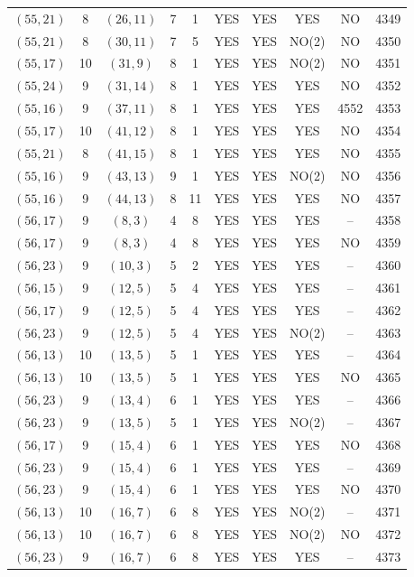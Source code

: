 \begin{longtable}{|c|c|c|c|c|c|c|c|c|c|}
$(55, 21)$ & 8 & $(26, 11)$ & 7 & 1 & YES & YES & YES & NO & 4349\\
$(55, 21)$ & 8 & $(30, 11)$ & 7 & 5 & YES & YES & NO(2) & NO & 4350\\
$(55, 17)$ & 10 & $(31, 9)$ & 8 & 1 & YES & YES & NO(2) & NO & 4351\\
$(55, 24)$ & 9 & $(31, 14)$ & 8 & 1 & YES & YES & YES & NO & 4352\\
$(55, 16)$ & 9 & $(37, 11)$ & 8 & 1 & YES & YES & YES & 4552 & 4353\\
$(55, 17)$ & 10 & $(41, 12)$ & 8 & 1 & YES & YES & YES & NO & 4354\\
$(55, 21)$ & 8 & $(41, 15)$ & 8 & 1 & YES & YES & YES & NO & 4355\\
$(55, 16)$ & 9 & $(43, 13)$ & 9 & 1 & YES & YES & NO(2) & NO & 4356\\
$(55, 16)$ & 9 & $(44, 13)$ & 8 & 11 & YES & YES & YES & NO & 4357\\
$(56, 17)$ & 9 & $(8, 3)$ & 4 & 8 & YES & YES & YES & -- & 4358\\
$(56, 17)$ & 9 & $(8, 3)$ & 4 & 8 & YES & YES & YES & NO & 4359\\
$(56, 23)$ & 9 & $(10, 3)$ & 5 & 2 & YES & YES & YES & -- & 4360\\
$(56, 15)$ & 9 & $(12, 5)$ & 5 & 4 & YES & YES & YES & -- & 4361\\
$(56, 17)$ & 9 & $(12, 5)$ & 5 & 4 & YES & YES & YES & -- & 4362\\
$(56, 23)$ & 9 & $(12, 5)$ & 5 & 4 & YES & YES & NO(2) & -- & 4363\\
$(56, 13)$ & 10 & $(13, 5)$ & 5 & 1 & YES & YES & YES & -- & 4364\\
$(56, 13)$ & 10 & $(13, 5)$ & 5 & 1 & YES & YES & YES & NO & 4365\\
$(56, 23)$ & 9 & $(13, 4)$ & 6 & 1 & YES & YES & YES & -- & 4366\\
$(56, 23)$ & 9 & $(13, 5)$ & 5 & 1 & YES & YES & NO(2) & -- & 4367\\
$(56, 17)$ & 9 & $(15, 4)$ & 6 & 1 & YES & YES & YES & NO & 4368\\
$(56, 23)$ & 9 & $(15, 4)$ & 6 & 1 & YES & YES & YES & -- & 4369\\
$(56, 23)$ & 9 & $(15, 4)$ & 6 & 1 & YES & YES & YES & NO & 4370\\
$(56, 13)$ & 10 & $(16, 7)$ & 6 & 8 & YES & YES & NO(2) & -- & 4371\\
$(56, 13)$ & 10 & $(16, 7)$ & 6 & 8 & YES & YES & NO(2) & NO & 4372\\
$(56, 23)$ & 9 & $(16, 7)$ & 6 & 8 & YES & YES & YES & -- & 4373\\

\end{longtable}
